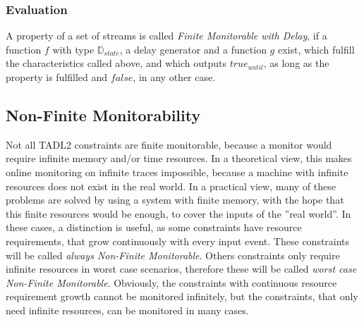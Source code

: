 		\subsubsection{Evaluation}
			A property of a set of streams is called \emph{Finite Monitorable with Delay}, if a function $f$ with type $\mathbb{D}_{state}$, a delay generator and a function $g$ exist, which fulfill the characteristics called above, and which outputs $true_{until}$, as long as the property is fulfilled and $false$, in any other case.
			
	\subsection{Non-Finite Monitorability}
		Not all TADL2 constraints are finite monitorable, because a monitor would require infinite memory and/or time resources. In a theoretical view, this makes online monitoring on infinite traces impossible, because a machine with infinite resources does not exist in the real world. In a practical view, many of these problems are solved by using a system with finite memory, with the hope that this finite resources would be enough, to cover the inputs of the ''real world''. In these cases, a distinction is useful, as some constraints have resource requirements, that grow continuously with every input event. These constraints will be called \emph{always Non-Finite Monitorable}. Others constraints only require infinite resources in worst case scenarios, therefore these will be called \emph{worst case Non-Finite Monitorable}. Obviously, the constraints with continuous resource requirement growth cannot be monitored infinitely, but the constraints, that only need infinite resources, can be monitored in many cases.
		
		
			
		
		
	 